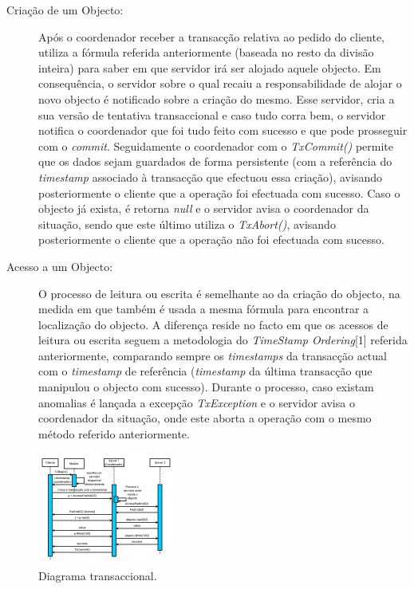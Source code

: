 \begin{description}
\item[Criação de um Objecto:] Após o coordenador receber a transacção relativa ao pedido do cliente, utiliza a fórmula referida anteriormente (baseada no resto da divisão inteira) para saber em que servidor irá ser alojado aquele objecto. Em consequência, o servidor sobre o qual recaiu a responsabilidade de alojar o novo objecto é notificado sobre a criação do mesmo. Esse servidor, cria a sua versão de tentativa transaccional e caso tudo corra bem, o servidor notifica o coordenador que foi tudo feito com sucesso e que pode prosseguir com o \textit{commit}. Seguidamente o coordenador com o \textit{TxCommit()} permite que os dados sejam guardados de forma persistente (com a referência do \textit{timestamp} associado à transacção que efectuou essa criação), avisando posteriormente o cliente que a operação foi efectuada com sucesso. Caso o objecto já exista, é retorna \textit{null} e o servidor avisa o coordenador da situação, sendo que este último utiliza o \textit{TxAbort()}, avisando posteriormente o cliente que a operação não foi efectuada com sucesso.

\item[Acesso a um Objecto:] O processo de leitura ou escrita é semelhante ao da criação do objecto, na medida em que também é usada a mesma fórmula para encontrar a localização do objecto. A diferença reside no facto em que os acessos de leitura ou escrita seguem a metodologia do \textit{TimeStamp Ordering}[1] referida anteriormente, comparando sempre os \textit{timestamps} da transacção actual com o \textit{timestamp} de referência (\textit{timestamp} da última transacção que manipulou o objecto com sucesso). Durante o processo, caso existam anomalias é lançada a excepção \textit{TxException} e o servidor avisa o coordenador da situação, onde este aborta a operação com o mesmo método referido anteriormente.
\end{description}

\begin{figure}
\centering
\includegraphics[width=0.4\textwidth]{transaccao.png}
\caption{\label{fig:transaccao}Diagrama transaccional.}
\end{figure}